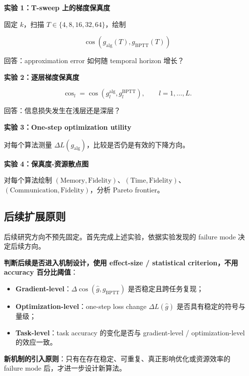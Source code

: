 \documentclass[journal,12pt,onecolumn]{IEEEtran}
\begin{document}
\textbf{实验 1：T-sweep 上的梯度保真度}

固定 $k$，扫描 $T\in\{4,8,16,32,64\}$，绘制

\begin{equation}
\cos(g_{\mathrm{alg}}(T),g_{\mathrm{BPTT}}(T))
\end{equation}

回答：approximation error 如何随 temporal horizon 增长？

\textbf{实验 2：逐层梯度保真度}

\begin{equation}
\cos_l=\cos(g_l^{\mathrm{alg}},g_l^{\mathrm{BPTT}}),
\qquad l=1,\dots,L.
\end{equation}

回答：信息损失发生在浅层还是深层？

\textbf{实验 3：One-step optimization utility}

对每个算法测量 $\Delta L(g_{\mathrm{alg}})$，比较是否仍是有效的下降方向。

\textbf{实验 4：保真度-资源散点图}

对每个算法绘制 $(\text{Memory},\text{Fidelity})$、$(\text{Time},\text{Fidelity})$、$(\text{Communication},\text{Fidelity})$，分析 Pareto frontier。

\subsection{后续扩展原则}

后续研究方向不预先固定。首先完成上述实验，依据实验发现的 failure mode 决定后续方向。

\textbf{判断后续是否进入机制设计，使用 effect-size / statistical criterion，不用 accuracy 百分比阈值}：

\begin{itemize}[leftmargin=1.5em,itemsep=0pt]
\item \textbf{Gradient-level}：$\Delta\cos(\hat g,g_{\mathrm{BPTT}})$ 是否稳定且跨任务复现；
\item \textbf{Optimization-level}：one-step loss change $\Delta L(\hat g)$ 是否具有稳定的符号与量级；
\item \textbf{Task-level}：task accuracy 的变化是否与 gradient-level / optimization-level 的效应一致。
\end{itemize}

\textbf{新机制的引入原则}：只有在存在稳定、可重复、真正影响优化或资源效率的 failure mode 后，才进一步设计新算法。



\end{document}
